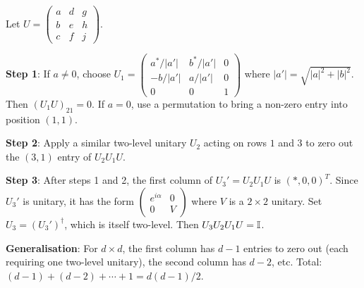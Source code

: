 \documentclass[12pt,oneside]{amsart}
\begin{document}
\begin{exercise}
\end{exercise}
\begin{solution}
  Let $U = \begin{pmatrix} a & d & g \\ b & e & h \\ c & f & j
  \end{pmatrix}$.

  \textbf{Step 1}: If $a \neq 0$, choose
  $U_1 = \begin{pmatrix} a^*/|a'| & b^*/|a'| & 0 \\ -b/|a'| & a/|a'| & 0
  \\ 0 & 0 & 1\end{pmatrix}$ where $|a'| = \sqrt{|a|^2+|b|^2}$.  Then
  $(U_1 U)_{21} = 0$.  If $a=0$, use a permutation to bring a non-zero
  entry into position $(1,1)$.

  \textbf{Step 2}: Apply a similar two-level unitary $U_2$ acting on rows
  $1$ and $3$ to zero out the $(3,1)$ entry of $U_2 U_1 U$.

  \textbf{Step 3}: After steps 1 and 2, the first column of $U_3' = U_2 U_1 U$
  is $(*, 0, 0)^T$.  Since $U_3'$ is unitary, it has the form
  $\begin{pmatrix} e^{i\alpha} & 0 \\ 0 & V \end{pmatrix}$ where $V$ is a
  $2\times 2$ unitary.  Set $U_3 = (U_3')^\dagger$, which is itself
  two-level.  Then $U_3 U_2 U_1 U = \mathbb{I}$.

  \textbf{Generalisation}: For $d\times d$, the first column has $d-1$
  entries to zero out (each requiring one two-level unitary), the second
  column has $d-2$, etc.  Total: $(d-1)+(d-2)+\cdots+1 = d(d-1)/2$.
\end{solution}
\end{document}

